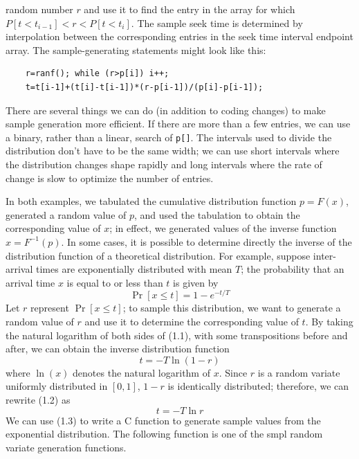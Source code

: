 \noindent random number $r$ and use it to find the entry in the array for which
$P[t<t_{i-1}]<r<P[t<t_i]$. The sample seek time is determined by interpolation
between the corresponding entries in the seek time interval endpoint array.
The sample-generating statements might look like this:
\begin{verbatim}
    r=ranf(); while (r>p[i]) i++;
    t=t[i-1]+(t[i]-t[i-1])*(r-p[i-1])/(p[i]-p[i-1]);
\end{verbatim}
There are several things we can do (in addition to coding changes) to make
sample generation more efficient. If there are more than a few entries, we can
use a binary, rather than a linear, search of \texttt{p[]}. The intervals used to
divide the distribution don't have to be the same width; we can use short
intervals where the distribution changes shape rapidly and long intervals where
the rate of change is slow to optimize the number of entries.

In both examples, we tabulated the cumulative distribution function $p=F(x)$,
generated a random value of $p$, and used the tabulation to obtain the
corresponding value of $x$; in effect, we generated values of the inverse
function $x=F^{-1}(p)$. In some cases, it is possible to determine directly the
inverse of the distribution function of a theoretical distribution. For
example, suppose inter-arrival times are exponentially distributed with mean
$T$; the probability that an arrival time $x$ is equal to or less than $t$ is
given by
\begin{equation}
\Pr[x\leq t]=1-e^{-t/T}\label{eq:exp-cdf}
\end{equation}
Let $r$ represent $\Pr[x\leq t]$; to sample this distribution, we want to generate a
random value of $r$ and use it to determine the corresponding value of $t$. By
taking the natural logarithm of both sides of (1.1), with some transpositions
before and after, we can obtain the inverse distribution function
\begin{equation}
t=-T\ln(1-r)
\end{equation}
where $\ln(x)$ denotes the natural logarithm of $x$. Since $r$ is a random variate
uniformly distributed in $[0,1]$, $1-r$ is identically distributed; therefore, we
can rewrite (1.2) as
\begin{equation}
t=-T\ln r
\end{equation}
We can use (1.3) to write a C function to generate sample values from the
exponential distribution. The following function is one of the smpl random
variate generation functions.

